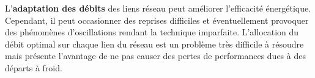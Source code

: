 
L'\textbf{adaptation des débits} des liens réseau peut améliorer l'efficacité
énergétique.  Cependant, il peut occasionner des reprises difficiles et
éventuellement provoquer des phénomènes d'oscillations rendant la technique
imparfaite.  L'allocation du débit optimal sur chaque lien du réseau est un
problème très difficile à résoudre mais présente l'avantage de ne pas causer
des pertes de performances dues à des départs à froid.
